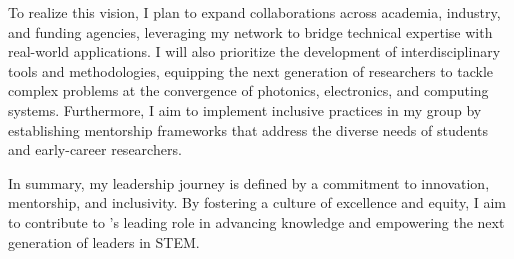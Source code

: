 To realize this vision, I plan to expand collaborations across academia, industry, and funding agencies, leveraging my network to bridge technical expertise with real-world applications. I will also prioritize the development of interdisciplinary tools and methodologies, equipping the next generation of researchers to tackle complex problems at the convergence of photonics, electronics, and computing systems. Furthermore, I aim to implement inclusive practices in my group by establishing mentorship frameworks that address the diverse needs of students and early-career researchers.

In summary, my leadership journey is defined by a commitment to innovation, mentorship, and inclusivity. By fostering a culture of excellence and equity, I aim to contribute to \appSchool{}'s leading role in advancing knowledge and empowering the next generation of leaders in STEM.